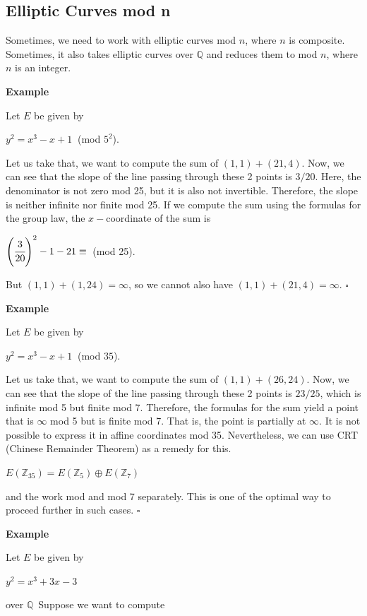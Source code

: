 \documentclass[a4paper, 12pt]{article}
\begin{document}
\subsection{Elliptic Curves mod n}
Sometimes, we need to work with elliptic curves mod $n$, where $n$ is composite. Sometimes, it also takes elliptic curves over $\mathbb{Q}$ and reduces them to mod $n$, where $n$ is an integer. \par
\textbf{Example}\par
Let $E$ be given by
\begin{center} $y^2=x^3-x+1 \:$ (mod $5^2$). \end{center}
Let us take that, we want to compute the sum of $(1, 1) + (21, 4)$. Now, we can see that the slope of the line passing through these 2 points is $3/20$. Here, the denominator is not zero mod 25, but it is also not invertible. Therefore, the slope is neither infinite nor finite mod 25. If we compute the sum using the formulas for the group law, the $x-$coordinate of the sum is
\begin{center} $\left(\cfrac{3}{20}\right)^2 - 1 - 21 \equiv \: $ (mod 25). \end{center}
But $(1,1)+(1,24) = \infty$, so we cannot also have $(1,1)+(21,4) = \infty$. $\square$\par
\textbf{Example}\par
Let $E$ be given by
\begin{center} $y^2=x^3-x+1 \:$ (mod $35$). \end{center}
Let us take that, we want to compute the sum of $(1, 1) + (26, 24)$. Now, we can see that the slope of the line passing through these 2 points is $23/25$, which is infinite mod 5 but finite mod 7. Therefore, the formulas for the sum yield a point that is $\infty$ mod 5 but is finite mod 7. That is, the point is partially at $\infty$. It is not possible to express it in affine coordinates mod 35. Nevertheless, we can use CRT (Chinese Remainder Theorem) as a remedy for this.
\begin{center} $E(\mathbb{Z}_{35}) = E(\mathbb{Z}_{5}) \oplus E(\mathbb{Z}_{7})$ \end{center}
and the work mod and mod 7 separately. This is one of the optimal way to proceed further in such cases. $\square$\par
\textbf{Example} \par
Let $E$ be given by 
\begin{center} $y^2=x^3+3x-3$ \end{center} 
over $\mathbb{Q}$ Suppose we want to compute
\end{document}
